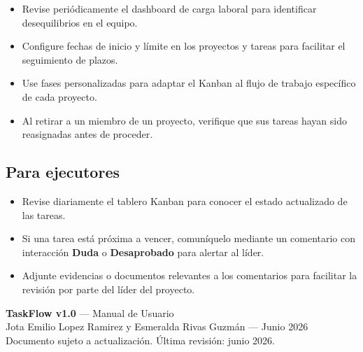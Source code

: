 \documentclass[12pt, a4paper]{article}
\begin{document}
\begin{itemize}
  \item Revise periódicamente el dashboard de carga laboral para identificar desequilibrios en el equipo.
  \item Configure fechas de inicio y límite en los proyectos y tareas para facilitar el seguimiento de plazos.
  \item Use fases personalizadas para adaptar el Kanban al flujo de trabajo específico de cada proyecto.
  \item Al retirar a un miembro de un proyecto, verifique que sus tareas hayan sido reasignadas antes de proceder.
\end{itemize}

\subsection{Para ejecutores}

\begin{itemize}
  \item Revise diariamente el tablero Kanban para conocer el estado actualizado de las tareas.
  \item Si una tarea está próxima a vencer, comuníquelo mediante un comentario con interacción \textbf{Duda} o \textbf{Desaprobado} para alertar al líder.
  \item Adjunte evidencias o documentos relevantes a los comentarios para facilitar la revisión por parte del líder del proyecto.
\end{itemize}

\vspace{2cm}
\noindent{\color{bordergray}\rule{\textwidth}{0.5pt}}
\begin{center}
  \small\color{medgray}
  \textbf{TaskFlow v1.0} — Manual de Usuario \\
  Jota Emilio Lopez Ramirez y Esmeralda Rivas Guzmán — Junio 2026 \\[2pt]
  Documento sujeto a actualización. Última revisión: junio 2026.
\end{center}
\end{document}
